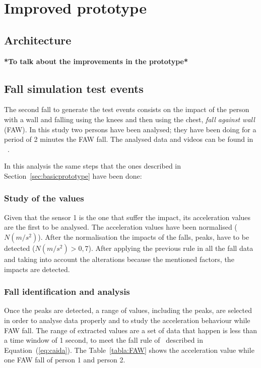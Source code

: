 \documentclass[conference]{IEEEtran}
\theoremstyle{definition}
\begin{document}
\section{Improved prototype}
\label{sec:improvedprototype}

\subsection{Architecture}
\label{sub:improvedprototypearchitecture}

\textbf{*To talk about the improvements in the prototype*}

\subsection{Fall simulation test events} %

The second fall to generate the test events consists on the impact of the person with a wall and falling using the knees and then
using the chest, \textit{fall against wall} (FAW). In this study two persons have been analysed; they have been doing for a period 
of 2 minutes the FAW fall. The analysed data and videos can be found in ~\cite{}.

In this analysis the same steps that the ones described in Section~\ref{sec:basicprototype} have been done:

\subsubsection*{Study of the values} Given that the sensor 1 is the one that suffer the impact, its acceleration values are the first
to be analysed. The acceleration values have been normalised ($N(m/s^2)$). After the normalisation the impacts of the falls, peaks, 
have to be detected ($N(m/s^2) > 0,7$). After applying the previous rule in all the fall data and taking into account the alterations 
because the mentioned factors, the impacts are detected.

\subsubsection*{Fall identification and analysis} Once the peaks are detected, a range of values, including the peaks, 
are selected in order to analyse data properly and to study the acceleration behaviour while FAW fall. 
The range of extracted values are a set of data that happen is less 
than a time window of 1 second, to meet the fall rule of~\cite{Luder2009} described in Equation~(\ref{eq:caida}). 
The Table~\ref{tabla:FAW} shows the 
acceleration value while one FAW fall of person 1 and person 2. 
\end{document}
